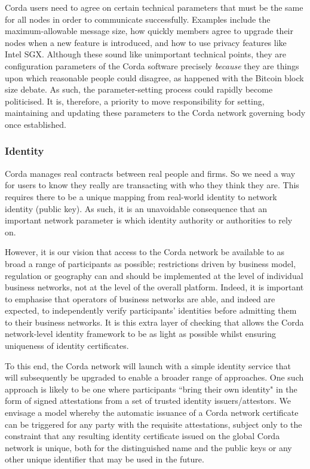 \documentclass{article}
\begin{document}
Corda users need to agree on certain technical parameters that must be the same for all nodes in order to communicate successfully. Examples include the maximum-allowable message size, how quickly members agree to upgrade their nodes when a new feature is introduced, and how to use privacy features like Intel SGX. Although these sound like unimportant technical points, they are configuration parameters of the Corda software precisely \textit{because} they are things upon which reasonable people could disagree, as happened with the Bitcoin block size debate. As such, the parameter-setting process could rapidly become politicised. It is, therefore, a priority to move responsibility for setting, maintaining and updating these parameters to the Corda network governing body once established.

\subsubsection{Identity}

Corda manages real contracts between real people and firms. So we need a way for users to know they really are transacting with who they think they are. This requires there to be a unique mapping from real-world identity to network identity (public key). As such, it is an unavoidable consequence that an important network parameter is which identity authority or authorities to rely on.

However, it is our vision that access to the Corda network be available to as broad a range of participants as possible; restrictions driven by business model, regulation or geography can and should be implemented at the level of individual business networks, not at the level of the overall platform. Indeed, it is important to emphasise that operators of business networks are able, and indeed are expected, to independently verify participants' identities before admitting them to their business networks. It is this extra layer of checking that allows the Corda network-level identity framework to be as light as possible whilst ensuring uniqueness of identity certificates.

To this end, the Corda network will launch with a simple identity service that will subsequently be upgraded to enable a broader range of approaches. One such approach is likely to be one where participants ``bring their own identity" in the form of signed attestations from a set of trusted identity issuers/attestors. We envisage a model whereby the automatic issuance of a Corda network certificate can be triggered for any party with the requisite attestations, subject only to the constraint that any resulting identity certificate issued on the global Corda network is unique, both for the distinguished name and the public keys or any other unique identifier that may be used in the future.
\end{document}
